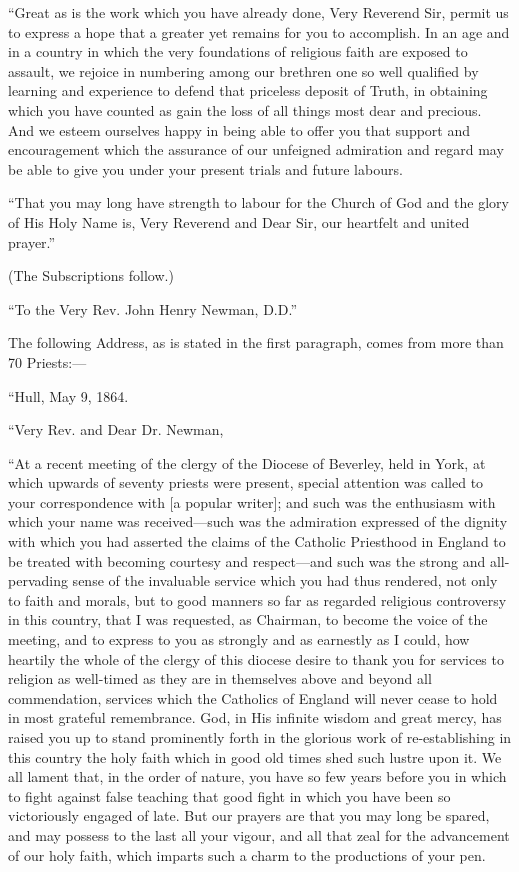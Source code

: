 ``Great as is the work which you have already done, Very Reverend
Sir, permit us to express a hope that a greater yet remains for you to
accomplish. In an age and in a country in which the very foundations of
religious faith are exposed to assault, we rejoice in numbering among
our brethren one so well qualified by learning and experience to defend
that priceless deposit of Truth, in obtaining which you have counted as
gain the loss of all things most dear and precious. And we esteem
ourselves happy in being able to offer you that support and
encouragement which the assurance of our unfeigned admiration and regard
may be able to give you under your present trials and future labours.

``That you may long have strength to labour for the Church of God
and the glory of His Holy Name is, Very Reverend and Dear Sir, our
heartfelt and united prayer.''

(The Subscriptions follow.)

``To the Very Rev. John Henry Newman, D.D.''


The following Address, as is stated in the first paragraph, comes
from more than 70 Priests:—

``Hull, May 9, 1864.

``Very Rev. and Dear Dr. Newman,

``At a recent meeting of the clergy of the Diocese of Beverley, held
in York, at which upwards of seventy priests were present, special
attention was called to your correspondence with [a popular writer]; and
such was the enthusiasm with which your name was received—such was the
admiration expressed of the dignity with which you had asserted the
claims of the Catholic Priesthood in England to be treated with becoming courtesy and respect—and such was the strong and all-pervading
sense of the invaluable service which you had thus rendered, not only to
faith and morals, but to good manners so far as regarded religious
controversy in this country, that I was requested, as Chairman, to
become the voice of the meeting, and to express to you as strongly and
as earnestly as I could, how heartily the whole of the clergy of this
diocese desire to thank you for services to religion as well-timed as
they are in themselves above and beyond all commendation, services which
the Catholics of England will never cease to hold in most grateful
remembrance. God, in His infinite wisdom and great mercy, has raised you
up to stand prominently forth in the glorious work of re-establishing in
this country the holy faith which in good old times shed such lustre
upon it. We all lament that, in the order of nature, you have so few
years before you in which to fight against false teaching that good
fight in which you have been so victoriously engaged of late. But our
prayers are that you may long be spared, and may possess to the last all
your vigour, and all that zeal for the advancement of our holy faith,
which imparts such a charm to the productions of your pen.

